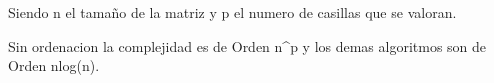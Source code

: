 Siendo n el tamaño de la matriz y p el numero de casillas que se valoran.

Sin ordenacion la complejidad es de Orden n^p y los demas algoritmos son de Orden nlog(n).